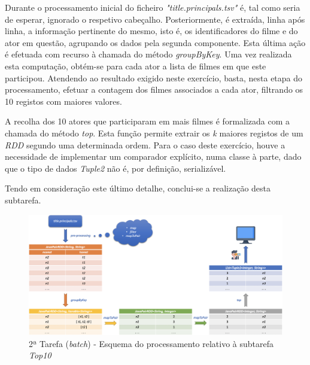 \documentclass[a4paper]{report}
\begin{document}
            Durante o processamento inicial do ficheiro \textsl{"title.principals.tsv"} é, tal como seria de esperar, ignorado o respetivo cabeçalho.
            Posteriormente, é extraída, linha após linha, a informação pertinente do mesmo, isto é, os identificadores do filme e do ator em questão, agrupando os dados pela segunda componente. Esta última ação é efetuada com recurso à chamada do método \textit{groupByKey}.
            Uma vez realizada esta computação, obtém-se para cada ator a lista de filmes em que este participou. Atendendo ao resultado exigido neste exercício, basta, nesta etapa do processamento, efetuar a contagem dos filmes associados a cada ator, filtrando os 10 registos com maiores valores.

            A recolha dos 10 atores que participaram em mais filmes é formalizada com a chamada do método \textit{top}. Esta função permite extrair os \textit{k} maiores registos de um \textit{RDD} segundo uma determinada ordem.
            Para o caso deste exercício, houve a necessidade de implementar um comparador explícito, numa classe à parte, dado que o tipo de dados \textit{Tuple2} não é, por definição, serializável.

            Tendo em consideração este último detalhe, conclui-se a realização desta subtarefa.

            \begin{figure}[H]
                \centering
                \includegraphics[width=1.0\textwidth]{Imagens/2ª Tarefa - Top10.png}
                \caption{2ª Tarefa (\textit{batch}) - Esquema do processamento relativo à subtarefa \textit{Top10}}
                \label{fig:13}
            \end{figure}
\end{document}
